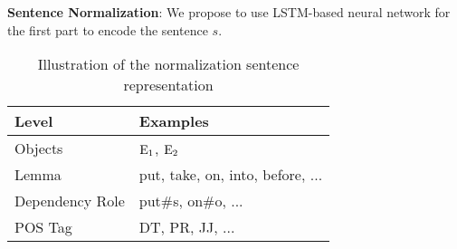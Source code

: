 %
\noindent
\textbf{Sentence Normalization}:
We propose to use LSTM-based neural network for the first part to encode the sentence $s$.
%
\begin{table}[th!]
	\centering
\small
	\begin{tabular}{l|l}
		\hline
		\textbf{Level}	&  \textbf{Examples}\\ 		\hline
		Objects	& $\textnormal{E}_1$, $\textnormal{E}_2$ \\ 		\hline
		Lemma & put, take, on, into, before, ...\\ 		\hline 
		Dependency Role	& put\#s, on\#o, ... \\ 		\hline 
		POS Tag	& DT, PR, JJ, ... \\ 		\hline 
	\end{tabular}
	\caption{Illustration of the normalization sentence representation }
	\label{tab:norm}
\end{table}
